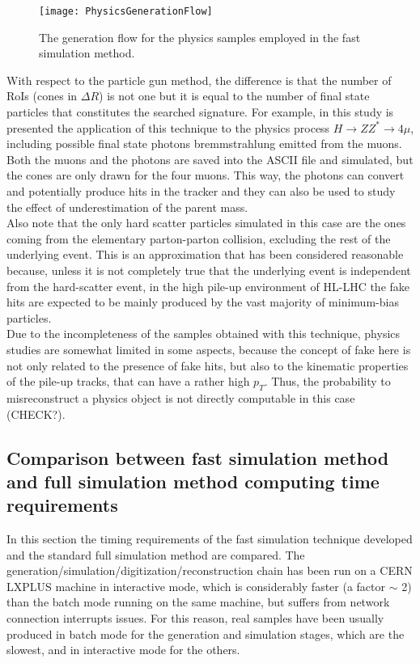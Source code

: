 \documentclass[a4paper,twoside,12pt]{article}
\begin{document}
\begin{figure} [h]
	\texttt{[image: PhysicsGenerationFlow]}
	\caption{The generation flow for the physics samples employed in the fast 
	simulation method. }
	\label{fig:PhysicsGenerationFlow}
\end{figure}

With respect to the particle gun method, the difference is that the number of RoIs (cones in
$\Delta R$) is not one but it is equal to the number of final state particles that constitutes the
searched signature. For example,
in this study is presented the application of this technique to the physics process
$H \rightarrow ZZ^* \rightarrow 4\mu$, including possible final state photons bremmstrahlung emitted from the muons. Both the muons and the photons are saved into the 
ASCII file and simulated, but the cones are only drawn for the four muons. This way, the photons can convert and potentially produce hits in the
tracker and they can also be used to study the effect of underestimation of the parent mass.\\

Also note that the only hard scatter particles simulated in this case are the ones coming from
the elementary parton-parton collision, excluding the rest of the underlying event. This
is an approximation that has been considered reasonable because, unless it is not completely
true that the underlying event is independent from the hard-scatter event, in the high pile-up
environment of HL-LHC the fake hits are expected to be mainly produced by the vast majority of minimum-bias particles. \\

Due to the incompleteness of the samples obtained with this technique, physics studies are somewhat limited in some aspects, because the 
concept of fake here is not only related to the presence of fake hits, but also to the kinematic 
properties of the pile-up tracks, that can have a rather high $p_T$. Thus, the probability to misreconstruct a physics object
is not directly computable in this case (CHECK?).

\subsection{Comparison between fast simulation method and full simulation method computing time requirements}

In this section the timing requirements of the fast simulation technique developed and the
standard full simulation method are compared.
The generation/simulation/digitization/reconstruction chain has been run on a 
CERN LXPLUS machine in interactive mode, which is considerably faster (a factor $\sim$ 2) than the batch mode running on the same machine,
but suffers from network connection interrupts issues. For this reason, real samples have been  
usually produced in batch mode for the generation and simulation stages, which are the slowest, and in interactive
mode for the others.
\end{document}

